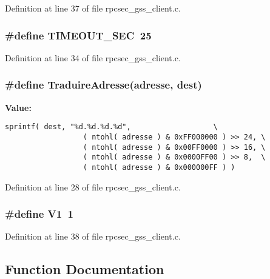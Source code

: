 Definition at line 37 of file rpcsec\_\-gss\_\-client.c.
\subsubsection{\setlength{\rightskip}{0pt plus 5cm}\#define TIMEOUT\_\-SEC\ 25}\label{rpcsec__gss__client_8c_a1}




Definition at line 34 of file rpcsec\_\-gss\_\-client.c.
\subsubsection{\setlength{\rightskip}{0pt plus 5cm}\#define Traduire\-Adresse(adresse, dest)}\label{rpcsec__gss__client_8c_a0}


{\bf Value:}

\footnotesize\begin{verbatim}sprintf( dest, "%d.%d.%d.%d",                   \
                  ( ntohl( adresse ) & 0xFF000000 ) >> 24, \
                  ( ntohl( adresse ) & 0x00FF0000 ) >> 16, \
                  ( ntohl( adresse ) & 0x0000FF00 ) >> 8,  \
                  ( ntohl( adresse ) & 0x000000FF ) )
\end{verbatim}\normalsize 


Definition at line 28 of file rpcsec\_\-gss\_\-client.c.
\subsubsection{\setlength{\rightskip}{0pt plus 5cm}\#define V1\ 1}\label{rpcsec__gss__client_8c_a5}




Definition at line 38 of file rpcsec\_\-gss\_\-client.c.

\subsection{Function Documentation}
